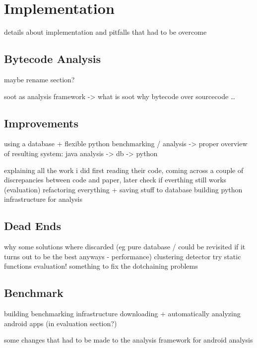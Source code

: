 \chapter{Implementation}
details about implementation and pitfalls that had to be overcome

\section{Bytecode Analysis}
maybe rename section?

soot as analysis framework -> what is soot
why bytecode over sourcecode
\ldots

\section{Improvements}
using a database + flexible python benchmarking / analysis
-> proper overview of resulting system: java analysis -> db -> python

explaining all the work i did
    first reading their code, coming across a couple of discrepancies between code and paper, later check if everthing still works (evaluation)
    refactoring everything + saving stuff to database
    building python infrastructure for analysis

\section{Dead Ends}
why some solutions where discarded (eg pure database / could be revisited if it turns out to be the best anyways - performance)
    clustering detector try
static functions evaluation!
something to fix the dotchaining problems

\section{Benchmark}

building benchmarking infrastructure
downloading + automatically analyzing android apps (in evaluation section?)

some changes that had to be made to the analysis framework for android analysis
